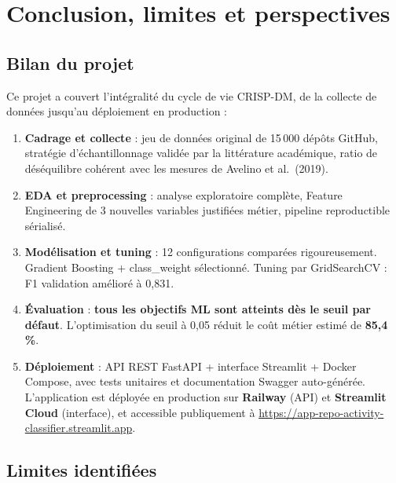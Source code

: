\documentclass[12pt,a4paper]{article}
\begin{document}
\newpage
\section{Conclusion, limites et perspectives}

\subsection{Bilan du projet}

Ce projet a couvert l'intégralité du cycle de vie CRISP-DM, de la collecte de données jusqu'au
déploiement en production :

\begin{enumerate}
  \item \textbf{Cadrage et collecte} : jeu de données original de 15\,000 dépôts GitHub, stratégie
    d'échantillonnage validée par la littérature académique, ratio de déséquilibre cohérent avec les
    mesures de Avelino et al.~(2019).
  \item \textbf{EDA et preprocessing} : analyse exploratoire complète, Feature Engineering de
    3 nouvelles variables justifiées métier, pipeline reproductible sérialisé.
  \item \textbf{Modélisation et tuning} : 12 configurations comparées rigoureusement. Gradient
    Boosting + class\_weight sélectionné. Tuning par GridSearchCV : F1 validation amélioré à 0,831.
  \item \textbf{Évaluation} : \textbf{tous les objectifs ML sont atteints dès le seuil par défaut}.
    L'optimisation du seuil à 0,05 réduit le coût métier estimé de \textbf{85,4\,\%}.
  \item \textbf{Déploiement} : API REST FastAPI + interface Streamlit + Docker Compose,
    avec tests unitaires et documentation Swagger auto-générée. L'application est déployée
    en production sur \textbf{Railway} (API) et \textbf{Streamlit Cloud} (interface), et
    accessible publiquement à \url{https://app-repo-activity-classifier.streamlit.app}.
\end{enumerate}

\subsection{Limites identifiées}
\end{document}
